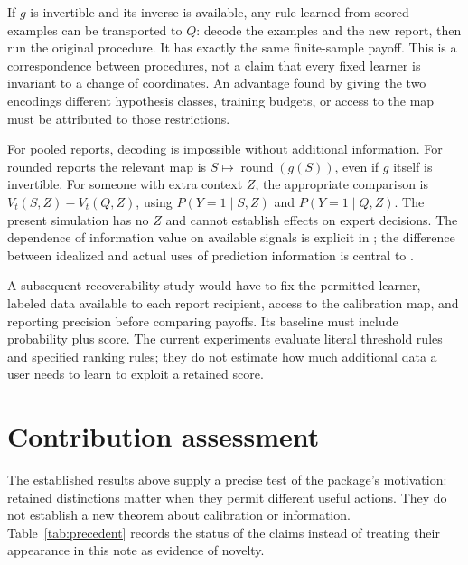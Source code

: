 If $g$ is invertible and its inverse is available, any rule learned from scored examples can be transported to $Q$: decode the examples and the new report, then run the original procedure. It has exactly the same finite-sample payoff. This is a correspondence between procedures, not a claim that every fixed learner is invariant to a change of coordinates. An advantage found by giving the two encodings different hypothesis classes, training budgets, or access to the map must be attributed to those restrictions.

For pooled reports, decoding is impossible without additional information. For rounded reports the relevant map is $S\mapsto\operatorname{round}(g(S))$, even if $g$ itself is invertible. For someone with extra context $Z$, the appropriate comparison is $V_t(S,Z)-V_t(Q,Z)$, using $P(Y=1\mid S,Z)$ and $P(Y=1\mid Q,Z)$. The present simulation has no $Z$ and cannot establish effects on expert decisions. The dependence of information value on available signals is explicit in \citet{guo2026information}; the difference between idealized and actual uses of prediction information is central to \citet{hullman2025conformal}.

A subsequent recoverability study would have to fix the permitted learner, labeled data available to each report recipient, access to the calibration map, and reporting precision before comparing payoffs. Its baseline must include probability plus score. The current experiments evaluate literal threshold rules and specified ranking rules; they do not estimate how much additional data a user needs to learn to exploit a retained score.

\clearpage
\section{Contribution assessment}
The established results above supply a precise test of the package's motivation: retained distinctions matter when they permit different useful actions. They do not establish a new theorem about calibration or information. Table~\ref{tab:precedent} records the status of the claims instead of treating their appearance in this note as evidence of novelty.

